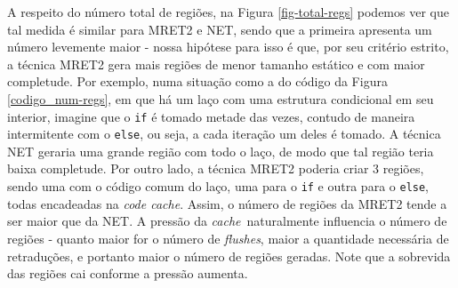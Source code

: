 \documentclass[12pt,twoside]{article}
\newcommand{\ccache}{\emph{code cache}}
\newcommand{\cache}{\emph{cache}}
\begin{document}
A respeito do número total de regiões, na Figura \ref{fig-total-regs} podemos ver que tal medida é similar para MRET2 e NET, sendo que a primeira apresenta um número levemente maior - nossa hipótese para isso é que, por seu critério estrito, a técnica MRET2 gera mais regiões de menor tamanho estático e com maior completude. Por exemplo, numa situação como a do código da Figura \ref{codigo_num-regs},  em que há um laço com uma estrutura condicional em seu interior, imagine que o \texttt{if} é tomado metade das vezes, contudo de maneira intermitente com o \texttt{else}, ou seja, a cada iteração um deles é tomado. A técnica NET geraria uma grande região com todo o laço, de modo que tal região teria baixa completude. Por outro lado, a técnica MRET2 poderia criar 3 regiões, sendo uma com o código comum do laço, uma para o \texttt{if} e outra para o \texttt{else}, todas encadeadas na \ccache. Assim, o número de regiões da MRET2 tende a ser maior que da NET. A pressão da \cache~naturalmente influencia o número de regiões - quanto maior for o número de \emph{flushes}, maior a quantidade necessária de retraduções, e portanto maior o número de regiões geradas. Note que a sobrevida das regiões cai conforme a pressão aumenta.
\end{document}
